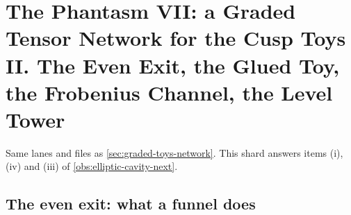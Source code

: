 
\section{The Phantasm VII: a Graded Tensor Network for the Cusp Toys II. The Even Exit, the Glued Toy, the Frobenius Channel, the Level Tower}
\label{sec:graded-toys-exits}

Same lanes and files as \cref{sec:graded-toys-network}. This shard answers items (i), (iv) and (iii) of
\cref{obs:elliptic-cavity-next}.

\subsection{The even exit: what a funnel does}

